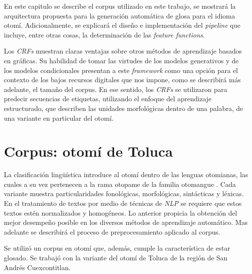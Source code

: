 \documentclass[letterpaper,12pt,oneside]{scrbook}
\theoremstyle{definition}
\begin{document}
	
	En este capitulo se describe el corpus utilizado en este trabajo, se mostrará la arquitectura propuesta para la generación automática de glosa para el idioma otomí. Adicionalmente, se explicará el diseño e implementación del \textit{pipeline} que incluye, entre otras cosas, la determinación de las \textit{feature functions}.

	

	Los \textit{CRFs} muestran claras ventajas sobre otros métodos de aprendizaje basados en gráficas. Su habilidad de tomar las virtudes de los modelos generativos y de los modelos condicionales presentan a este \textit{framework} como una opción para el contexto de los bajos recursos digitales que nos impone, como se describirá más adelante, el tamaño del corpus. En ese sentido, los \textit{CRFs} se utilizaron para predecir secuencias de etiquetas, utilizando el enfoque del aprendizaje estructurado, que describen las unidades morfológicas dentro de una palabra, de una variante en particular del otomí. 

	

	\section{Corpus: otomí de Toluca}

	

	

	La clasificación lingüística introduce al otomí dentro de las lenguas otomianas, las cuales a su vez pertenecen a la rama otopame de la familia otomangue \citep{barrientos2004otomies}. Cada variante muestra particularidades fonológicas, morfológicas, sintácticas y léxicas. En el tratamiento de textos por medio de técnicas de \textit{NLP} se requiere que estos textos estén normalizados y homogéneos. Lo anterior propicia la obtención del mejor desempeño posible en los diversos métodos de aprendizaje automático. Mas adelante se describirá el proceso de preprocesamiento aplicado al corpus.

	

	Se utilizó un corpus en otomí que, además, cumple la característica de estar glosado. Se trabajó con la variante del otomí de Toluca de la región de San Andrés Cuexcontitlan.
\end{document}
